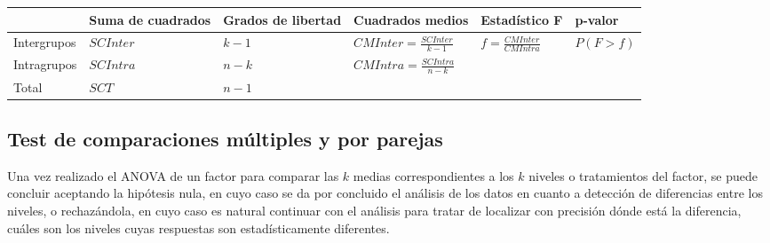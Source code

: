 \documentclass[
  spanish,
  a4paper,
]{scrreport}
\newcounter{none} %
\theoremstyle{plain}
\theoremstyle{definition}
\theoremstyle{definition}
\theoremstyle{remark}
\begin{document}
{\def\LTcaptype{none} %
\begin{longtable}[]{@{}
  >{\raggedright\arraybackslash}p{}
  >{\centering\arraybackslash}p{}
  >{\centering\arraybackslash}p{}
  >{\centering\arraybackslash}p{}
  >{\centering\arraybackslash}p{}
  >{\centering\arraybackslash}p{}@{}}
\toprule\noalign{}
\begin{minipage}[b]{\linewidth}\raggedright
\end{minipage} & \begin{minipage}[b]{\linewidth}\centering
Suma de cuadrados
\end{minipage} & \begin{minipage}[b]{\linewidth}\centering
Grados de libertad
\end{minipage} & \begin{minipage}[b]{\linewidth}\centering
Cuadrados medios
\end{minipage} & \begin{minipage}[b]{\linewidth}\centering
Estadístico F
\end{minipage} & \begin{minipage}[b]{\linewidth}\centering
p-valor
\end{minipage} \\
\midrule\noalign{}
\endhead
\bottomrule\noalign{}
\endlastfoot
Intergrupos & \(SCInter\) & \(k-1\) & \(CMInter=\frac{SCInter}{k-1}\) &
\(f=\frac{CMInter}{CMIntra}\) & \(P(F>f)\) \\
Intragrupos & \(SCIntra\) & \(n-k\) & \(CMIntra=\frac{SCIntra}{n-k}\) &
& \\
Total & \(SCT\) & \(n-1\) & & & \\
\end{longtable}
}

\subsection{Test de comparaciones múltiples y por
parejas}\label{test-de-comparaciones-muxfaltiples-y-por-parejas}

Una vez realizado el ANOVA de un factor para comparar las \(k\) medias
correspondientes a los \(k\) niveles o tratamientos del factor, se puede
concluir aceptando la hipótesis nula, en cuyo caso se da por concluido
el análisis de los datos en cuanto a detección de diferencias entre los
niveles, o rechazándola, en cuyo caso es natural continuar con el
análisis para tratar de localizar con precisión dónde está la
diferencia, cuáles son los niveles cuyas respuestas son estadísticamente
diferentes.
\end{document}
